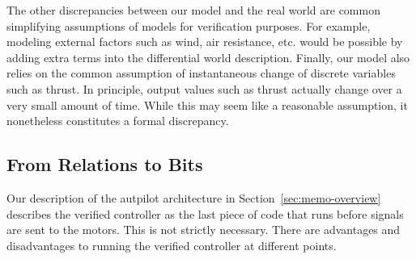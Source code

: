 The other discrepancies between our model and the real world are common
simplifying assumptions of models for verification purposes.  For example,
modeling external factors such as wind, air resistance, etc. would be
possible by adding extra terms into the differential world description.
Finally, our model also relies on the common assumption of instantaneous
change of discrete variables such as thrust.  In principle, output values
such as thrust actually change over a very small amount of time.  While
this may seem like a reasonable assumption, it nonetheless constitutes a
formal discrepancy.

\subsection{From Relations to Bits}
\label{sec:discrete-model}

Our description of the autpilot architecture in
Section~\ref{sec:memo-overview} describes the verified controller as the
last piece of code that runs before signals are sent to the motors.  This
is not strictly necessary.  There are advantages and disadvantages to
running the verified controller at different points.


